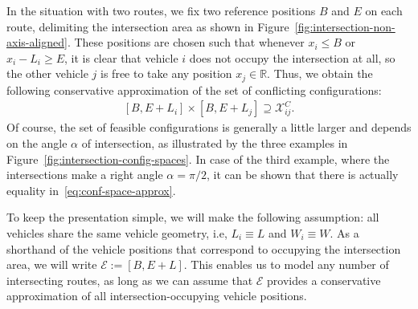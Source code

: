 \documentclass[a4paper]{report}
\theoremstyle{definition}
\theoremstyle{plain}
\begin{document}
%
In the situation with two routes, we fix two reference positions $B$ and $E$ on
each route, delimiting the intersection area as shown in
Figure~\ref{fig:intersection-non-axis-aligned}.
%
These positions are chosen such that whenever $x_{i} \leq B$ or
$x_{i} - L_{i} \geq E$, it is clear that vehicle $i$ does not occupy the intersection
at all, so the other vehicle $j$ is free to take any position
$x_{j} \in \mathbb{R}$.
%
Thus, we obtain the following conservative approximation of the set of conflicting
configurations:
\begin{align}\label{eq:conf-space-approx}
  [B,E + L_{i}] \times [B, E + L_{j}] \supseteq \mathcal{X}_{ij}^{C} .
\end{align}
Of course, the set of feasible configurations is generally a little larger and
depends on the angle $\alpha$ of intersection, as illustrated by the three examples
in Figure~\ref{fig:intersection-config-spaces}.
%
In case of the third example, where the intersections make a right angle
$\alpha = \pi/2$, it can be shown that there is actually equality in~\eqref{eq:conf-space-approx}.

To keep the presentation simple, we will make the following assumption: all
vehicles share the same vehicle geometry, i.e, $L_{i} \equiv L$ and
$W_{i} \equiv W$. As a shorthand of the vehicle positions that correspond to
occupying the intersection area, we will write $\mathcal{E} := [B, E + L]$.
%
This enables us to model any number of intersecting routes, as long as we can
assume that $\mathcal{E}$ provides a conservative approximation of all
intersection-occupying vehicle positions.
\end{document}
